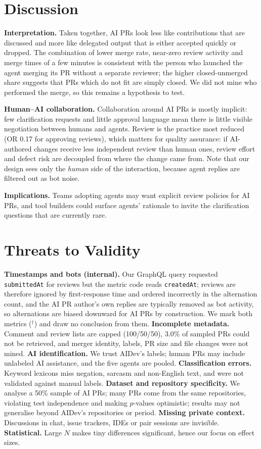 \documentclass[conference]{IEEEtran}
\begin{document}
\section{Discussion}
\textbf{Interpretation.} Taken together, AI PRs look less like contributions that are discussed and more like delegated output that is either accepted quickly or dropped. The combination of lower merge rate, near-zero review activity and merge times of a few minutes is consistent with the person who launched the agent merging its PR without a separate reviewer; the higher closed-unmerged share suggests that PRs which do not fit are simply closed. We did not mine who performed the merge, so this remains a hypothesis to test.

\textbf{Human--AI collaboration.} Collaboration around AI PRs is mostly implicit: few clarification requests and little approval language mean there is little visible negotiation between humans and agents. Review is the practice most reduced (OR 0.17 for approving reviews), which matters for quality assurance: if AI-authored changes receive less independent review than human ones, review effort and defect risk are decoupled from where the change came from. Note that our design sees only the \emph{human} side of the interaction, because agent replies are filtered out as bot noise.

\textbf{Implications.} Teams adopting agents may want explicit review policies for AI PRs, and tool builders could surface agents' rationale to invite the clarification questions that are currently rare.

\section{Threats to Validity}
\textbf{Timestamps and bots (internal).} Our GraphQL query requested \texttt{submittedAt} for reviews but the metric code reads \texttt{createdAt}; reviews are therefore ignored by first-response time and ordered incorrectly in the alternation count, and the AI PR author's own replies are typically removed as bot activity, so alternations are biased downward for AI PRs by construction. We mark both metrics ($^\dagger$) and draw no conclusion from them. \textbf{Incomplete metadata.} Comment and review lists are capped (100/50/50), 3.0\% of sampled PRs could not be retrieved, and merger identity, labels, PR size and file changes were not mined. \textbf{AI identification.} We trust AIDev's labels; human PRs may include unlabeled AI assistance, and the five agents are pooled. \textbf{Classification errors.} Keyword lexicons miss negation, sarcasm and non-English text, and were not validated against manual labels. \textbf{Dataset and repository specificity.} We analyse a 50\% sample of AI PRs; many PRs come from the same repositories, violating test independence and making $p$-values optimistic; results may not generalise beyond AIDev's repositories or period. \textbf{Missing private context.} Discussions in chat, issue trackers, IDEs or pair sessions are invisible. \textbf{Statistical.} Large $N$ makes tiny differences significant, hence our focus on effect sizes.
\end{document}
